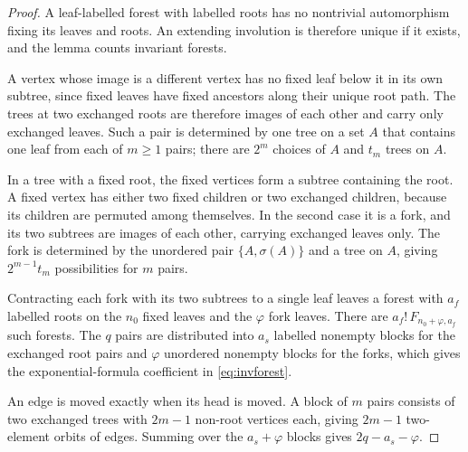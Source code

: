 \documentclass[11pt,a4paper]{article}
\theoremstyle{definition}
\begin{document}
\begin{proof}
A leaf-labelled forest with labelled roots has no nontrivial automorphism fixing its leaves and roots. An extending involution is therefore unique if it exists, and the lemma counts invariant forests.

A vertex whose image is a different vertex has no fixed leaf below it in its own subtree, since fixed leaves have fixed ancestors along their unique root path. The trees at two exchanged roots are therefore images of each other and carry only exchanged leaves. Such a pair is determined by one tree on a set $A$ that contains one leaf from each of $m\ge1$ pairs; there are $2^m$ choices of $A$ and $t_m$ trees on $A$.

In a tree with a fixed root, the fixed vertices form a subtree containing the root. A fixed vertex has either two fixed children or two exchanged children, because its children are permuted among themselves. In the second case it is a fork, and its two subtrees are images of each other, carrying exchanged leaves only. The fork is determined by the unordered pair $\{A,\sigma(A)\}$ and a tree on $A$, giving $2^{m-1}t_m$ possibilities for $m$ pairs.

Contracting each fork with its two subtrees to a single leaf leaves a forest with $a_f$ labelled roots on the $n_0$ fixed leaves and the $\varphi$ fork leaves. There are $a_f!\,F_{n_0+\varphi,a_f}$ such forests. The $q$ pairs are distributed into $a_s$ labelled nonempty blocks for the exchanged root pairs and $\varphi$ unordered nonempty blocks for the forks, which gives the exponential-formula coefficient in \eqref{eq:invforest}.

An edge is moved exactly when its head is moved. A block of $m$ pairs consists of two exchanged trees with $2m-1$ non-root vertices each, giving $2m-1$ two-element orbits of edges. Summing over the $a_s+\varphi$ blocks gives $2q-a_s-\varphi$.
\end{proof}
\end{document}
